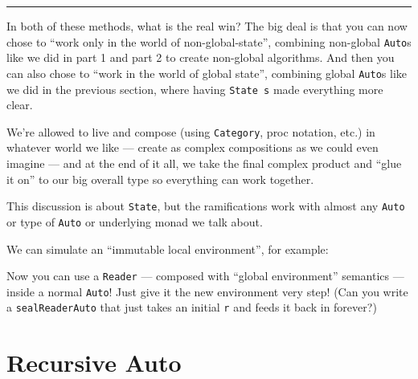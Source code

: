 \documentclass[]{article}
\newenvironment{Shaded}{}{}
\newcommand{\CommentTok}[1]{\textcolor[rgb]{0.38,0.63,0.69}{\textit{#1}}}
\newcommand{\DataTypeTok}[1]{\textcolor[rgb]{0.56,0.13,0.00}{#1}}
\newcommand{\KeywordTok}[1]{\textcolor[rgb]{0.00,0.44,0.13}{\textbf{#1}}}
\newcommand{\NormalTok}[1]{#1}
\newcommand{\OperatorTok}[1]{\textcolor[rgb]{0.40,0.40,0.40}{#1}}
\newcommand{\OtherTok}[1]{\textcolor[rgb]{0.00,0.44,0.13}{#1}}
\begin{document}
\begin{center}\rule{0.5\linewidth}{0.5pt}\end{center}

In both of these methods, what is the real win? The big deal is that you can now
chose to ``work only in the world of non-global-state'', combining non-global
\texttt{Auto}s like we did in part 1 and part 2 to create non-global algorithms.
And then you can also chose to ``work in the world of global state'', combining
global \texttt{Auto}s like we did in the previous section, where having
\texttt{State\ s} made everything more clear.

We're allowed to live and compose (using \texttt{Category}, proc notation, etc.)
in whatever world we like --- create as complex compositions as we could even
imagine --- and at the end of it all, we take the final complex product and
``glue it on'' to our big overall type so everything can work together.

This discussion is about \texttt{State}, but the ramifications work with almost
any \texttt{Auto} or type of \texttt{Auto} or underlying monad we talk about.

We can simulate an ``immutable local environment'', for example:

\begin{Shaded}
\end{Shaded}

Now you can use a \texttt{Reader} --- composed with ``global environment''
semantics --- inside a normal \texttt{Auto}! Just give it the new environment
very step! (Can you write a \texttt{sealReaderAuto} that just takes an initial
\texttt{r} and feeds it back in forever?)

\section{Recursive Auto}\label{recursive-auto}
\end{document}
